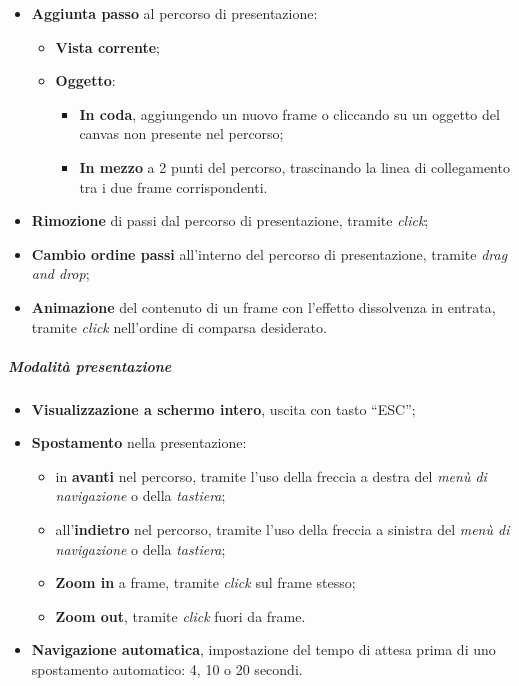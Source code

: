 \begin{itemize}
  \begin{itemize}
    \item \textbf{Aggiunta passo} al percorso di presentazione:
    \begin{itemize}
      \item \textbf{Vista corrente};
      \item \textbf{Oggetto}: 
      \begin{itemize}
	\item \textbf{In coda}, aggiungendo un nuovo frame o cliccando su un oggetto del canvas non presente nel percorso;
	\item \textbf{In mezzo} a 2 punti del percorso, trascinando la linea di collegamento tra i due frame corrispondenti.
      \end{itemize}
    \end{itemize}
    \item \textbf{Rimozione} di passi dal percorso di presentazione, tramite \emph{click};
    \item \textbf{Cambio ordine passi} all'interno del percorso di presentazione, tramite \emph{drag and drop};
    \item \textbf{Animazione} del contenuto di un frame con l'effetto dissolvenza in entrata, 
    tramite \emph{click} nell'ordine di comparsa desiderato.
  \end{itemize}
\end{itemize}
\subparagraph{Modalità presentazione}
\begin{itemize}
 \item \textbf{Visualizzazione a schermo intero}, uscita con tasto ``ESC'';
 \item \textbf{Spostamento} nella presentazione:
 \begin{itemize}
  \item in \textbf{avanti} nel percorso, tramite l'uso della freccia a destra del \emph{menù di navigazione} o della \emph{tastiera};
  \item all'\textbf{indietro} nel percorso, tramite l'uso della freccia a sinistra del \emph{menù di navigazione} o della \emph{tastiera};
  \item \textbf{Zoom in} a frame, tramite \emph{click} sul frame stesso;
  \item \textbf{Zoom out}, tramite \emph{click} fuori da frame.
 \end{itemize}
 \item \textbf{Navigazione automatica}, impostazione del tempo di attesa prima di uno spostamento automatico: 4, 10 o 20 secondi.
\end{itemize}
